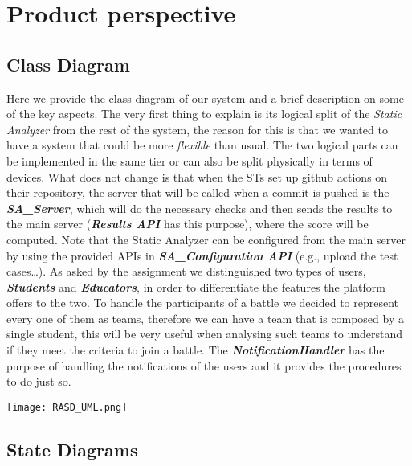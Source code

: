 \section{Product perspective}
\label{s:Product_perspective}%

\subsection{Class Diagram}
\label{ss:class_diagram}%
Here we provide the class diagram of our system and a brief description on some of the key aspects. The very first thing to explain is its logical split of the \textit{Static Analyzer} from the rest of the system, the reason for this is that we wanted to have a system that could be more \textit{flexible} than usual. The two logical parts can be implemented in the same tier or can also be split physically in terms of devices. What does not change is that when the STs set up github actions on their repository, the server that will be called when a commit is pushed is the \textbf{\textit{SA\_Server}}, which will do the necessary checks and then sends the results to the main server (\textbf{\textit{Results API}} has this purpose), where the score will be computed. Note that the Static Analyzer can be configured from the main server by using the provided APIs in \textbf{\textit{SA\_Configuration API}} (e.g., upload the test cases…). 
As asked by the assignment we distinguished two types of users, \textbf{\textit{Students}} and \textbf{\textit{Educators}}, in order to differentiate the features the platform offers to the two. To handle the participants of a battle we decided to represent every one of them as teams, therefore we can have a team that is composed by a single student, this will be very useful when analysing such teams to understand if they meet the criteria to join a battle. The \textbf{\textit{NotificationHandler}} has the purpose of handling the notifications of the users and it provides the procedures to do just so.


\begin{center}
  \texttt{[image: RASD\_UML.png]}
\end{center}

\subsection{State Diagrams}
\label{ss:state_diagrams}%

